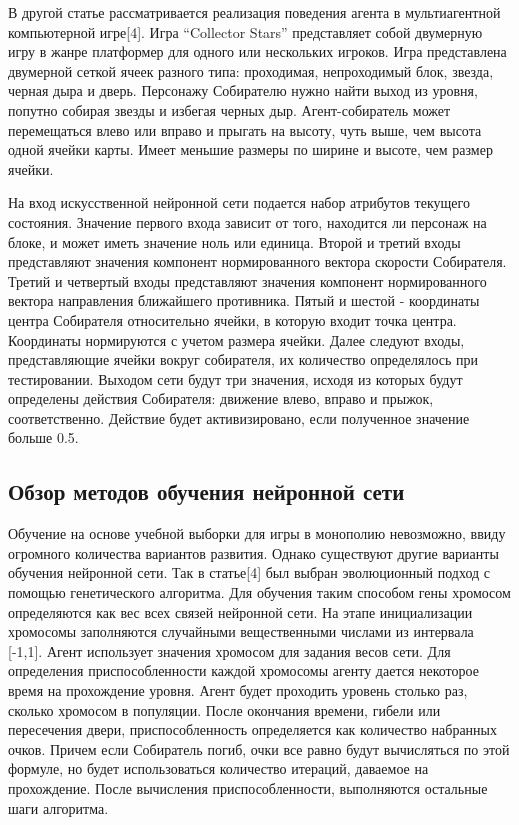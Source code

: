 В другой статье рассматривается реализация поведения агента в мультиагентной компьютерной игре[4]. Игра “Collector Stars” представляет собой двумерную игру в жанре платформер для одного или нескольких игроков. Игра представлена двумерной сеткой ячеек разного типа: проходимая, непроходимый блок, звезда, черная дыра и дверь. Персонажу Собирателю нужно найти выход из уровня, попутно собирая звезды и избегая черных дыр. Агент-собиратель может перемещаться влево или вправо и прыгать на высоту, чуть выше, чем высота одной ячейки карты.  Имеет меньшие размеры по ширине и высоте, чем размер ячейки.

На вход искусственной нейронной сети подается набор атрибутов текущего состояния. Значение первого входа зависит от того, находится ли персонаж на блоке, и может иметь значение ноль или единица. Второй и третий входы представляют значения компонент нормированного вектора скорости Собирателя. Третий и четвертый входы представляют значения компонент нормированного вектора направления ближайшего противника. Пятый и шестой - координаты центра Собирателя относительно ячейки, в которую входит точка центра. Координаты нормируются с учетом размера ячейки. Далее следуют входы, представляющие ячейки вокруг собирателя, их количество определялось при тестировании. Выходом сети будут три значения, исходя из которых будут определены действия Собирателя: движение влево, вправо и прыжок, соответственно. Действие будет активизировано, если полученное значение больше 0.5.
\subsection{Обзор методов обучения нейронной сети}
Обучение на основе учебной выборки для игры в монополию невозможно, ввиду огромного количества вариантов развития. Однако существуют другие варианты обучения нейронной сети. Так в статье[4] был выбран эволюционный подход с помощью генетического алгоритма. Для обучения таким способом гены хромосом определяются как вес всех связей нейронной сети. На этапе инициализации хромосомы заполняются случайными вещественными числами из интервала [-1,1]. Агент использует значения хромосом для задания весов сети. Для определения приспособленности каждой хромосомы агенту дается некоторое время на прохождение уровня. Агент будет проходить уровень столько раз, сколько хромосом в популяции. После окончания времени, гибели или пересечения двери, приспособленность определяется как количество набранных очков. Причем если Собиратель погиб, очки все равно будут вычисляться по этой формуле, но будет использоваться количество итераций, даваемое на прохождение. После вычисления приспособленности, выполняются остальные шаги алгоритма.

